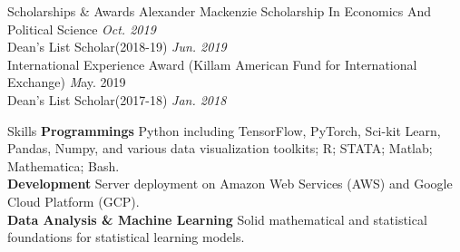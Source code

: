 \documentclass{resume} %
\begin{document}
\begin{rSection}{Scholarships \& Awards}
{Alexander Mackenzie Scholarship In Economics And Political Science} \hfill {\em Oct. 2019} \\
{Dean's List Scholar(2018-19)} \hfill {\em Jun. 2019} \\
{International Experience Award (Killam American Fund for International Exchange)} \hfill{\emph May. 2019} \\
{Dean's List Scholar(2017-18)} \hfill {\em Jan. 2018}
\end{rSection}

\begin{rSection}{Skills}
\textbf{Programmings} Python including TensorFlow, PyTorch, Sci-kit Learn, Pandas, Numpy, and various data visualization toolkits; R; STATA; Matlab; Mathematica; Bash.
\\\textbf{Development} Server deployment on Amazon Web Services (AWS) and Google Cloud Platform (GCP).
\\\textbf{Data Analysis \& Machine Learning} Solid mathematical and statistical foundations for statistical learning models.
\end{rSection}
\end{document}
